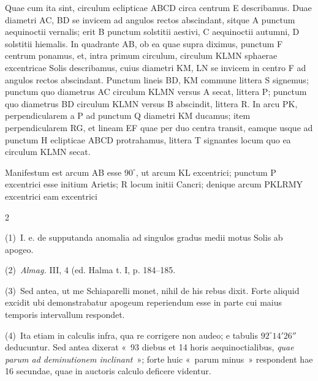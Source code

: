 \documentclass[10pt,a4paper]{article}
\newcommand{\A}[1]{\hypertarget{#1}{}}
\newcommand{\NN}[2]{%
  \par\noindent\textup{(#1)}\ #2%
}
\begin{document}
\A{AB01-PDF0132-P04}
Quae cum ita sint, circulum eclipticae ABCD circa centrum E
describamus. Duae diametri AC, BD se invicem ad angulos rectos
abscindant, sitque A punctum aequinoctii vernalis; erit B punctum
solstitii aestivi, C aequinoctii autumni, D solstitii hiemalis.
In quadrante AB, ob ea quae supra diximus, punctum F centrum
ponamus, et, intra primum circulum, circulum KLMN sphaerae
excentricae Solis describamus, cuius diametri KM, LN se invicem
in centro F ad angulos rectos abscindant. Punctum lineis BD, KM
commune littera S signemus; punctum quo diametrus AC circulum
KLMN versus A secat, littera P; punctum quo diametrus BD circulum
KLMN versus B abscindit, littera R. In arcu PK, perpendicularem
a P ad punctum Q diametri KM ducamus; item perpendicularem RG,
et lineam EF quae per duo centra transit, eamque usque ad
punctum H eclipticae ABCD protrahamus, littera T signantes locum
quo ea circulum KLMN secat.

\A{AB01-PDF0132-P05}
Manifestum est arcum AB esse $90^\circ$, ut arcum KL excentrici;
punctum P excentrici esse initium Arietis; R locum initii Cancri;
denique arcum PKLRMY excentrici eam excentrici


\begin{multicols}{2}
\footnotesize

\A{AB01-PDF0132-N01}
\NN{1}{I. e. de supputanda anomalia ad singulos gradus medii
motus Solis ab apogeo.}

\A{AB01-PDF0132-N02}
\NN{2}{{\itshape Almag.} III, 4 (ed. Halma t. I, p. 184--185.}

\A{AB01-PDF0132-N03}
\NN{3}{Sed antea, ut me { Schiaparelli} monet, nihil de his rebus
dixit. Forte aliquid excidit ubi demonstrabatur apogeum
reperiendum esse in parte cui maius temporis intervallum
respondet.}

\A{AB01-PDF0132-N04}
\NN{4}{Ita etiam in calculis infra, qua re corrigere non audeo;
e tabulis $92^\circ14'26''$ deducuntur. Sed antea dixerat
«~93 diebus et 14 horis aequinoctialibus, {\itshape quae parum ad
deminutionem inclinant}~»; forte huic «~parum minus~» respondent
hae 16 secundae, quae in auctoris calculo deficere videntur.}

\end{multicols}
\end{document}
